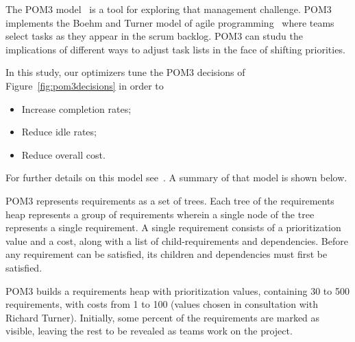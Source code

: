 \documentclass[10pt,journal,compsoc]{IEEEtran}
\newcommand{\bi}{\begin{itemize}}
\newcommand{\ei}{\end{itemize}}
\newcommand{\fig}[1]{Figure~\ref{fig:#1}}
\begin{document}
The POM3 model~\cite{port08,1204376}  is a tool
for exploring that management challenge.
POM3 implements the Boehm and Turner model of agile programming~\cite{turner03} where teams select tasks as they appear in the scrum backlog. POM3 can  studu the implications of different ways to adjust task lists in the face of shifting priorities.


 
In this study, our optimizers tune the 
POM3  decisions of \fig{pom3decisions} in order to
\bi
\item Increase completion rates;
\item Reduce idle rates;
\item Reduce overall cost.
\ei 
For further details on this model see~\cite{port08,1204376,turner03}. A summary
of that model is shown below.

 POM3 represents requirements as a set of trees.  
    Each tree of the requirements
    heap represents a group of requirements wherein a single node of the
    tree represents a single requirement.  A single requirement consists
    of a prioritization value and a cost, along with a list of
    child-requirements and dependencies.  Before any requirement can be
    satisfied, its children and dependencies must first be satisfied.
    
   POM3 builds a requirements heap with prioritization values,
    containing
     30 to 500 requirements, with costs from 1 to 100 (values 
     chosen in consultation with Richard Turner).  Initially,
    some percent of the requirements are marked
    as visible, leaving the rest to be revealed as teams work on the
    project.
\end{document}
